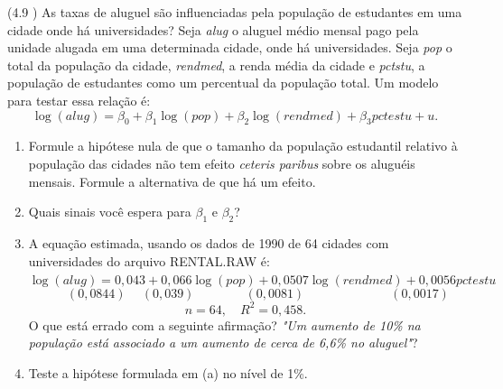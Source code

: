 \documentclass[12pt,letterpaper, onecolumn]{exam}
\begin{document}
\begin{questions}
    
    \question (4.9 \citep{wooldridge2010}) As taxas de aluguel são influenciadas pela população de estudantes em uma cidade onde há universidades? Seja \textit{alug} o aluguel médio mensal pago pela unidade alugada em uma determinada cidade, onde há universidades. Seja \textit{pop} o total da população da cidade, \textit{rendmed}, a renda média da cidade e \textit{pctstu}, a população de estudantes como um percentual da população total. Um modelo para testar essa relação é:
    \[
    \log(alug) = \beta_0 + \beta_1\log(pop) + \beta_2\log(rendmed) + \beta_3pctestu + u.
    \]
    \begin{enumerate}[label = (\alph*)]
        \item Formule a hipótese nula de que o tamanho da população estudantil relativo à população das cidades não tem efeito \textit{ceteris paribus} sobre os aluguéis mensais. Formule a alternativa de que há um efeito.
        \item Quais sinais você espera para $\beta_1$ e $\beta_2$?
        \item A equação estimada, usando os dados de 1990 de 64 cidades com universidades do arquivo RENTAL.RAW é:
        \[
        \widehat{\log(alug)} = 0,043 + 0,066\log(pop) + 0,0507\log(rendmed) + 0,0056pctestu
        \]\vspace{-2.0em}\[
        \phantom{--} (0,0844) \phantom{-} (0,039) \phantom{----} (0,0081) \phantom{-------} (0,0017)
        \]\vspace{-1.em}\[
        n = 64, \quad R^2 = 0,458.
        \] O que está errado com a seguinte afirmação? \textit{"Um aumento de 10\% na população está associado a um aumento de cerca de 6,6\% no aluguel"}?
        \item Teste a hipótese formulada em (a) no nível de 1\%.
    \end{enumerate}
    

\
\



\end{questions}
\end{document}
